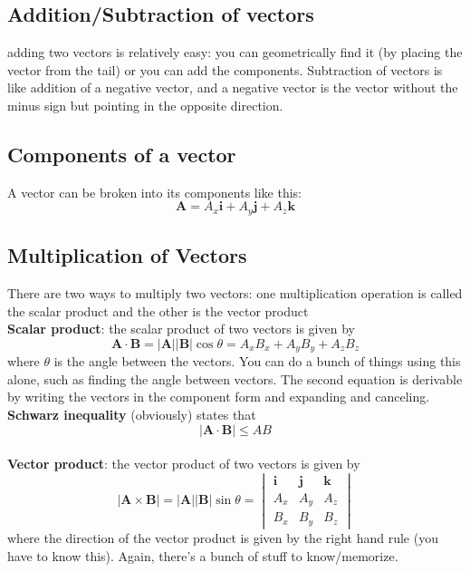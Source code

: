\documentclass[oneside]{book}
\numberwithin{equation}{chapter} %
\begin{document}
\subsection{Addition/Subtraction of vectors}
adding two vectors is relatively easy: you can geometrically find it (by placing the vector from the tail) or you can add the components. Subtraction of vectors is like addition of a negative vector, and a negative vector is the vector without the minus sign but pointing in the opposite direction.
\subsection{Components of a vector}
A vector can be broken into its components like this:
$$\mathbf A=A_x\mathbf{i}+A_y\mathbf{j}+A_z\mathbf{k}$$
\subsection{Multiplication of Vectors}
There are two ways to multiply two vectors: one multiplication operation is called the scalar product and the other is the vector product\\

\textbf{Scalar product}: the scalar product of two vectors is  given by 
\begin{equation}
	\mathbf{A\cdot B}=|\mathbf A||\mathbf B|\cos\theta=A_xB_x+A_yB_y+A_zB_z
\end{equation}
where $\theta$ is the angle between the vectors. You can do a bunch of things using this alone, such as finding the angle between vectors. The second equation is derivable by writing the vectors in the component form and expanding and canceling. \\
\textbf{Schwarz inequality} (obviously) states that 
\begin{equation}
	|\mathbf{A\cdot B}|\le AB
\end{equation}
\\

\textbf{Vector product}: the vector product of two vectors is given by 
\begin{equation}
	|\mathbf{A\times B}|=\mathbf{|A||B|}\sin\theta=\begin{vmatrix}
		\mathbf{i}&\mathbf{j}&\mathbf{k}\\A_x&A_y&A_z\\B_x&B_y&B_z
	\end{vmatrix}
\end{equation} 
where the direction of the vector product is given by the right hand rule (you have to know this). Again, there's a bunch of stuff to know/memorize.
\end{document}
